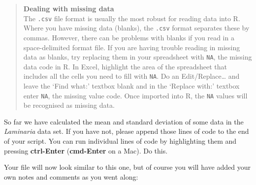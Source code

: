 \documentclass[
]{book}
\begin{document}
\begin{quote}
\textbf{Dealing with missing data}\\
The \texttt{.csv} file format is usually the most robust for reading data into R. Where you have missing data (blanks), the \texttt{.csv} format separates these by commas. However, there can be problems with blanks if you read in a space-delimited format file. If you are having trouble reading in missing data as blanks, try replacing them in your spreadsheet with \texttt{NA}, the missing data code in R. In Excel, highlight the area of the spreadsheet that includes all the cells you need to fill with \texttt{NA}. Do an Edit/Replace\ldots{} and leave the `Find what:' textbox blank and in the `Replace with:' textbox enter \texttt{NA}, the missing value code. Once imported into R, the \texttt{NA} values will be recognised as missing data.
\end{quote}

So far we have calculated the mean and standard deviation of some data in the \emph{Laminaria} data set. If you have not, please append those lines of code to the end of your script. You can run individual lines of code by highlighting them and pressing \textbf{ctrl-Enter} (\textbf{cmd-Enter} on a Mac). Do this.

Your file will now look similar to this one, but of course you will have added your own notes and comments as you went along:
\end{document}
